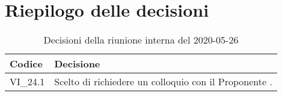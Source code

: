 \section{Riepilogo delle decisioni}
\begin{longtable}{
	 >{\centering}p{} >{}p{} }

	\caption{Decisioni della riunione interna del 2020-05-26}\\

	\textbf{\color{white}Codice} &
	\textbf{\color{white}Decisione}
	\tabularnewline
	\endhead

	VI\_24.1 & Scelto di richiedere un colloquio con il Proponente \Proponente{}. \\
\end{longtable}
